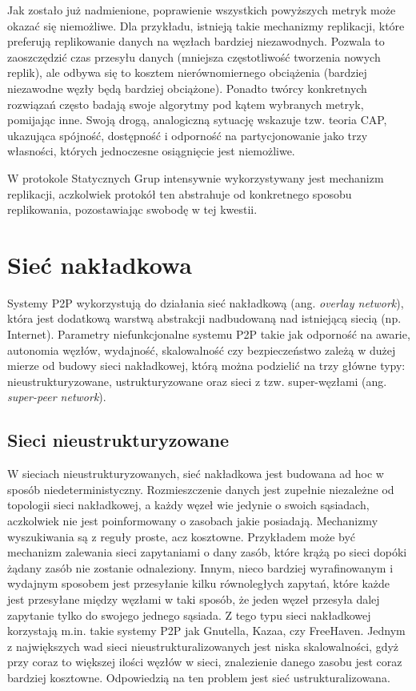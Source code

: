 \documentclass[12pt, twoside, openany]{report}
\begin{document}
Jak zostało już nadmienione, poprawienie wszystkich powyższych metryk może okazać się niemożliwe. Dla przykładu, istnieją takie mechanizmy replikacji, które preferują replikowanie danych na węzłach bardziej niezawodnych. Pozwala to zaoszczędzić czas przesyłu danych (mniejsza częstotliwość tworzenia nowych replik), ale odbywa się to kosztem nierównomiernego obciążenia (bardziej niezawodne węzły będą bardziej obciążone). Ponadto twórcy konkretnych rozwiązań często badają swoje algorytmy pod kątem wybranych metryk, pomijając inne. Swoją drogą, analogiczną sytuację wskazuje tzw. teoria CAP, ukazująca spójność, dostępność i odporność na partycjonowanie jako trzy własności, których jednoczesne osiągnięcie jest niemożliwe.

W protokole Statycznych Grup intensywnie wykorzystywany jest mechanizm replikacji, aczkolwiek protokół ten abstrahuje od konkretnego sposobu replikowania, pozostawiając swobodę w tej kwestii.


\section{Sieć nakładkowa}
Systemy P2P wykorzystują do działania sieć nakładkową (ang. \textit{overlay network}), która jest dodatkową warstwą abstrakcji nadbudowaną nad istniejącą siecią (np. Internet). Parametry niefunkcjonalne systemu P2P takie jak odporność na awarie, autonomia węzłów, wydajność, skalowalność czy bezpieczeństwo zależą w dużej mierze od budowy sieci nakładkowej, którą można podzielić na trzy główne typy: nieustrukturyzowane, ustrukturyzowane oraz sieci z tzw. super-węzłami (ang. \textit{super-peer network}).

\subsection{Sieci nieustrukturyzowane}
\label{paragraf_sieci_ustrukturyzowane}
W sieciach nieustrukturyzowanych, sieć nakładkowa jest budowana ad hoc w sposób niedeterministyczny. Rozmieszczenie danych jest zupełnie niezależne od topologii sieci nakładkowej, a każdy węzeł wie jedynie o swoich sąsiadach, aczkolwiek nie jest poinformowany o zasobach jakie posiadają. Mechanizmy wyszukiwania są z reguły proste, acz kosztowne. Przykładem może być mechanizm zalewania sieci zapytaniami o dany zasób, które krążą po sieci dopóki żądany zasób nie zostanie odnaleziony. Innym, nieco bardziej wyrafinowanym i wydajnym sposobem jest przesyłanie kilku równoległych zapytań, które każde jest przesyłane między węzłami w taki sposób, że jeden węzeł przesyła dalej zapytanie tylko do swojego jednego sąsiada. Z tego typu sieci nakładkowej korzystają m.in. takie systemy P2P jak Gnutella, Kazaa, czy FreeHaven. Jednym z największych wad sieci nieustrukturalizowanych jest niska skalowalności, gdyż przy coraz to większej ilości węzłów w sieci, znalezienie danego zasobu jest coraz bardziej kosztowne. Odpowiedzią na ten problem jest sieć ustrukturalizowana.
\end{document}
